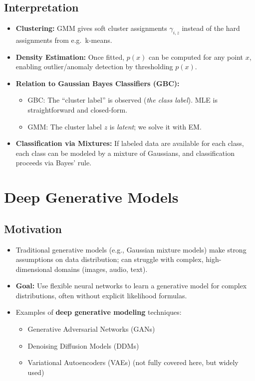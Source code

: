 \documentclass[twocolumn]{article}
\begin{document}
\begin{spacing}{1}
\subsection{Interpretation}
\begin{itemize}
    \item \textbf{Clustering:} GMM gives soft cluster assignments $\gamma_{i,z}$ instead of the hard assignments from e.g.\ k-means.
    \item \textbf{Density Estimation:} Once fitted, $p(x)$ can be computed for any point $x$, enabling outlier/anomaly detection by thresholding $p(x)$.
    \item \textbf{Relation to Gaussian Bayes Classifiers (GBC):} 
    \begin{itemize}
        \item GBC: The “cluster label” is observed (\emph{the class label}). MLE is straightforward and closed-form.
        \item GMM: The cluster label $z$ is \emph{latent}; we solve it with EM. 
    \end{itemize}
    \item \textbf{Classification via Mixtures:} If labeled data are available for each class, each class can be modeled by a mixture of Gaussians, and classification proceeds via Bayes’ rule.
\end{itemize}

\section{Deep Generative Models}

\subsection{Motivation}
\begin{itemize}
    \item Traditional generative models (e.g., Gaussian mixture models) make strong assumptions on data distribution; can struggle with complex, high-dimensional domains (images, audio, text).
    \item \textbf{Goal:} Use flexible neural networks to learn a generative model for complex distributions, often without explicit likelihood formulas.
    \item Examples of \textbf{deep generative modeling} techniques:
    \begin{itemize}
        \item Generative Adversarial Networks (GANs)
        \item Denoising Diffusion Models (DDMs)
        \item Variational Autoencoders (VAEs) (not fully covered here, but widely used)
    \end{itemize}
\end{itemize}


\end{spacing}
\end{document}
